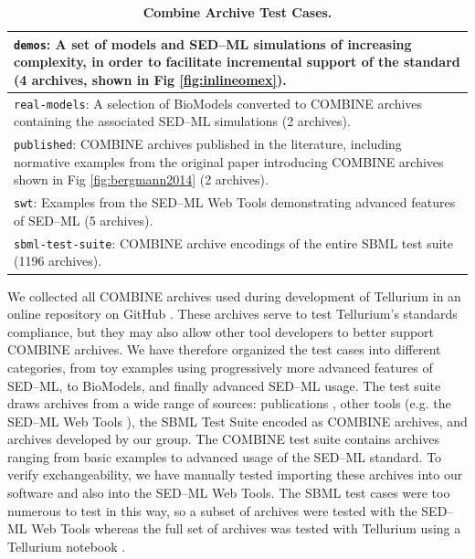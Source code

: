 \documentclass[10pt,letterpaper]{article}
\newlength\savedwidth
\newcommand\thickhline{\noalign{\global\savedwidth\arrayrulewidth\global\arrayrulewidth 2pt}%
\hline
\noalign{\global\arrayrulewidth\savedwidth}}
\begin{document}
\begin{table}[!ht]
\centering
\caption{
{\bf Combine Archive Test Cases.} }
\begin{tabular}{p{12cm}}
\hline %
  \texttt{demos}: A set of models and SED--ML simulations of increasing complexity, in order to facilitate incremental support of the standard (4 archives, shown in Fig \ref{fig:inlineomex}). \\ \hline
  \texttt{real-models}: A selection of BioModels converted to COMBINE archives containing the associated SED--ML simulations (2 archives). \\ \hline
  \texttt{published}: COMBINE archives published in the literature, including normative examples from the original paper introducing COMBINE archives \cite{bergmann2014combine} shown in Fig \ref{fig:bergmann2014} (2 archives). \\ \hline
  \texttt{swt}: Examples from the SED--ML Web Tools \cite{bergmann2017sed} demonstrating advanced features of SED--ML (5 archives). \\ \hline
  \texttt{sbml-test-suite}: COMBINE archive encodings of the entire SBML test suite (1196 archives). \\ \hline
\end{tabular}
\begin{flushleft} We collected all COMBINE archives used during development of Tellurium in an online repository on GitHub \cite{catests}. These archives serve to test Tellurium's standards compliance, but they may also allow other tool developers to better support COMBINE archives. We have therefore organized the test cases into different categories, from toy examples using progressively more advanced features of SED--ML, to BioModels, and finally advanced SED--ML usage. The test suite draws archives from a wide range of sources: publications \cite{bergmann2014combine,scharmf1000}, other tools (e.g. the SED--ML Web Tools \cite{bergmann2017sed}), the SBML Test Suite encoded as COMBINE archives, and archives developed by our group. The COMBINE test suite contains archives ranging from basic examples to advanced usage of the SED--ML standard. To verify exchangeability, we have manually tested importing these archives into our software and also into the SED--ML Web Tools. The SBML test cases were too numerous to test in this way, so a subset of archives were tested with the SED--ML Web Tools whereas the full set of archives was tested with Tellurium using a Tellurium notebook \cite{sbmltsnotebook}.
\end{flushleft}
\label{combine-archive-tests}
\end{table}
\end{document}

